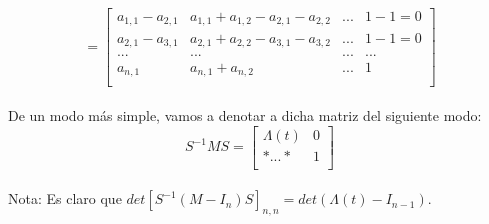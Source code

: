      \[= \begin{bmatrix}
     a_{1,1}-a_{2,1} & a_{1,1}+a_{1,2}-a_{2,1}-a_{2,2} & ... & 1-1 = 0  \\
     a_{2,1}-a_{3,1} & a_{2,1}+a_{2,2}-a_{3,1}-a_{3,2}&... & 1 - 1=0  \\
     ... & ... & ... & ... \\	
     a_{n,1} & a_{n,1}+a_{n,2} & ... & 1 \\
     \end{bmatrix}\]\\
     
     De un modo más simple, vamos a denotar a dicha matriz del siguiente modo:\\
     \[ S^{-1}MS = \left[\begin{array}{r|r}
     \Lambda (t) & 0 \\ \hline	
     * ... * & 1\\
     \end{array}\right]\]\\
  Nota:  Es claro que $ det[S^{-1}(M-I_{n})S]_{n,n} = det(\Lambda(t)-I_{n-1}) $.\\
  
